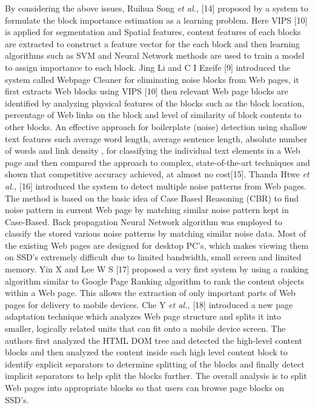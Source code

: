 \documentclass[fleqn,twoside]{article}
\begin{document}
\vskip 2mm
By considering the above issues, Ruihua Song {\it et al.,} [14] proposed by a system to formulate the block importance estimation as a learning problem. Here VIPS [10] is applied for segmentation and Spatial features, content features of each blocks are extracted to construct a feature vector for the each block and then learning algorithms such as SVM and Neural Network methods are used to train a model to assign importance to each block. Jing Li and C I Ezeife [9] introduced the system called Webpage Cleaner for eliminating noise blocks from Web pages, it first extracts Web blocks using VIPS [10] then relevant Web page blocks are identified by analyzing physical features of the blocks such as the block location, percentage of Web links on the block and level of similarity of block contents to other blocks. An effective approach for boilerplate (noise) detection using shallow text features such average word length, average sentence length, absolute number of words and link density , for classifying the individual text elements in a Web page and then compared the approach to complex, state-of-the-art techniques and shown that competitive accuracy achieved, at almost no cost[15]. Thanda Htwe {\it et al.,} [16] introduced the system to detect multiple noise patterns from Web pages. The method is based on the basic idea of Case Based Reasoning (CBR) to find noise pattern in current Web page by matching similar noise pattern kept in Case-Based. Back propagation Neural Network algorithm was employed to classify the stored various noise patterns by matching similar noise data. 
\vskip 2mm
Most of the existing Web pages are designed for desktop PC's, which makes viewing them on SSD's extremely difficult due to limited bandwidth, small screen and limited memory. Yin X and Lee W S [17] proposed a very first system by using a ranking algorithm similar to Google Page Ranking algorithm to rank the content objects within a Web page. This allows the extraction of only important parts of Web pages for delivery to mobile devices. Che Y {\it et al.,} [18] introduced a new page adaptation technique which analyzes Web page structure and splits it into smaller, logically related units that can fit onto a mobile device screen. The authors first analyzed the HTML DOM tree and detected the high-level content blocks and then analyzed the content inside each high level content block to identify explicit separators to determine splitting of the blocks and finally detect implicit separators to help split the blocks further. The overall analysis is to split Web pages into appropriate blocks so that users can browse page blocks on SSD's.
\end{document}
